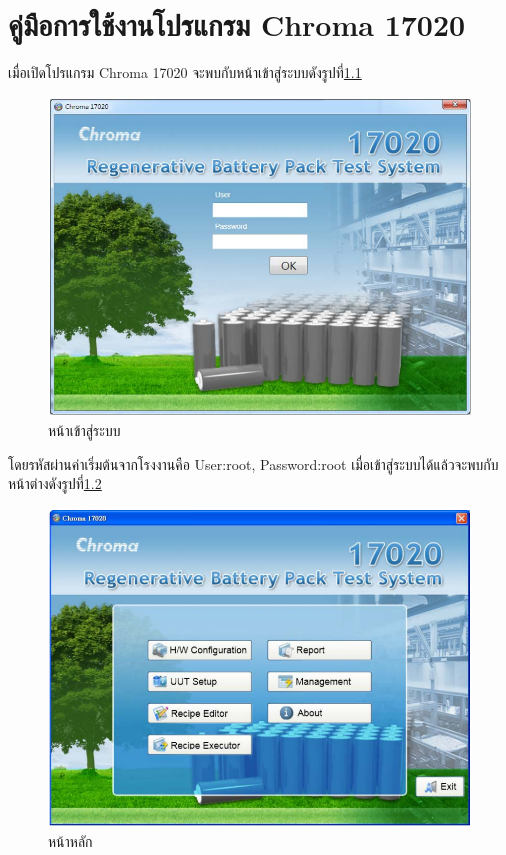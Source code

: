 \chapter{คู่มือการใช้งานโปรแกรม Chroma 17020}
 เมื่อเปิดโปรแกรม Chroma 17020 จะพบกับหน้าเข้าสู่ระบบดังรูปที่\ref{fig:Loggin}
 \begin{center}
	\begin{figure}[H]
		\includegraphics[width=1\linewidth]{Chapters/img/17020_Program/Loggin.png}
		\centering
		\captionsetup{justification=centering,margin=2cm}
		\caption{หน้าเข้าสู่ระบบ}
		\label{fig:Loggin}
	\end{figure}
\end{center}
โดยรหัสผ่านค่าเริ่มต้นจากโรงงานคือ User:root, Password:root เมื่อเข้าสู่ระบบได้แล้วจะพบกับหน้าต่างดังรูปที่\ref{Main_window}
\begin{center}
	\begin{figure}[H]
		\includegraphics[width=1\linewidth]{Chapters/img/17020_Program/Home.png}
		\centering
		\captionsetup{justification=centering,margin=2cm}
		\caption{หน้าหลัก}
		\label{Main_window}
	\end{figure}
\end{center}
